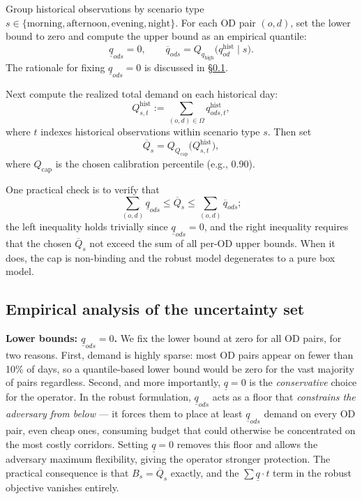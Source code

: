 \documentclass[11pt]{article}
\theoremstyle{definition}
\begin{document}
Group historical observations by scenario type $s \in \{\text{morning},
	\text{afternoon}, \text{evening}, \text{night}\}$.  For each OD pair $(o,d)$,
set the lower bound to zero and compute the upper bound as an empirical quantile:
\begin{equation}
	\underline{q}_{ods} = 0,
	\qquad
	\overline{q}_{ods} = Q_{q_{\mathrm{high}}}\!\bigl(q_{od}^{\mathrm{hist}} \mid s\bigr).
	\label{eq:quantiles}
\end{equation}
The rationale for fixing $\underline{q}_{ods}=0$ is discussed in
\S\ref{sec:empirical-uset}.

Next compute the realized total demand on each historical day:
\begin{equation}
	Q^{\mathrm{hist}}_{s,t}
	:= \sum_{(o,d)\in\Omega} q^{\mathrm{hist}}_{ods,t},
	\label{eq:hist-total}
\end{equation}
where $t$ indexes historical observations within scenario type $s$.  Then set
\begin{equation}
	\overline{Q}_s
	=
	Q_{Q_{\mathrm{cap}}}\!\bigl(Q^{\mathrm{hist}}_{s,t}\bigr),
	\label{eq:qcap-cal}
\end{equation}
where $Q_{\mathrm{cap}}$ is the chosen calibration percentile (e.g., 0.90).

One practical check is to verify that
\[
	\sum_{(o,d)} \underline{q}_{ods} \le \overline{Q}_s
	\le \sum_{(o,d)} \overline{q}_{ods};
\]
the left inequality holds trivially since $\underline{q}_{ods}=0$, and the
right inequality requires that the chosen $\overline{Q}_s$ not exceed the
sum of all per-OD upper bounds.  When it does, the cap is non-binding and the
robust model degenerates to a pure box model.

\subsection{Empirical analysis of the uncertainty set}
\label{sec:empirical-uset}

\textbf{Lower bounds: $\underline{q}_{ods} = 0$.}
We fix the lower bound at zero for all OD pairs, for two reasons.
First, demand is highly sparse: most OD pairs appear on fewer than 10\% of
days, so a quantile-based lower bound would be zero for the vast majority of
pairs regardless.
Second, and more importantly, $\underline{q} = 0$ is the \emph{conservative}
choice for the operator.  In the robust formulation, $\underline{q}_{ods}$
acts as a floor that \emph{constrains the adversary from below} --- it forces
them to place at least $\underline{q}_{ods}$ demand on every OD pair, even
cheap ones, consuming budget that could otherwise be concentrated on the most
costly corridors.  Setting $\underline{q} = 0$ removes this floor and allows
the adversary maximum flexibility, giving the operator stronger protection.
The practical consequence is that $B_s = \overline{Q}_s$ exactly, and the
$\sum\underline{q}\cdot t$ term in the robust objective vanishes entirely.
\end{document}
